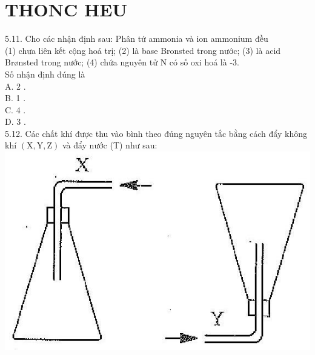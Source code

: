 \documentclass[10pt]{article}
\begin{document}
\section*{THONC HEU}
5.11. Cho các nhận định sau: Phân tứ ammonia và ion ammonium đều\\
(1) chưa liên kết cộng hoá trị; (2) là base Bronsted trong nước; (3) là acid Brønsted trong nước; (4) chứa nguyên tử N có số oxi hoá là -3.\\
Số nhận định đúng là\\
A. 2 .\\
B. 1 .\\
C. 4 .\\
D. 3 .\\
5.12. Các chất khí được thu vào bình theo đúng nguyên tắc bằng cách đẩy không khí $(\mathrm{X}, \mathrm{Y}, \mathrm{Z})$ và đẩy nước (T) như sau:\\
\includegraphics[max width=\textwidth, center]{2025_10_23_fa9073eecee116ad8cf2g-15(1)}\\
\end{document}
